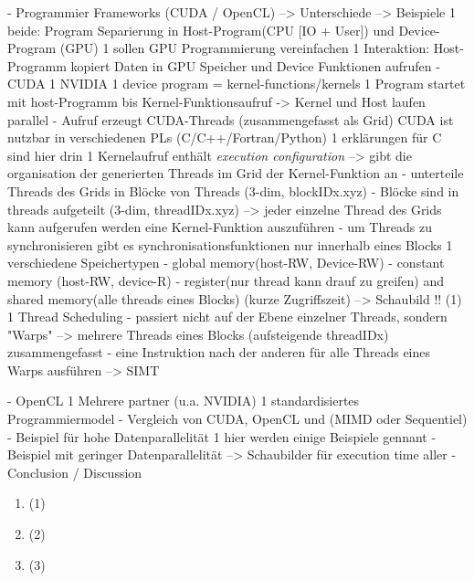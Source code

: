 \documentclass[a4paper,12pt]{llncs}
\numberwithin{equation}{section}
\begin{document}
    
    
  - Programmier Frameworks (CUDA / OpenCL)	
    --> Unterschiede
    --> Beispiele
    1 beide: Program Separierung in Host-Program(CPU [IO + User]) und Device-Program (GPU)
    1 sollen GPU Programmierung vereinfachen
    1 Interaktion: Host-Programm kopiert Daten in GPU Speicher und Device Funktionen aufrufen
    - CUDA
      1 NVIDIA
      1 device program = kernel-functions/kernels
      1 Program startet mit host-Programm bis Kernel-Funktionsaufruf -> Kernel und Host laufen parallel
      	- Aufruf erzeugt CUDA-Threads (zusammengefasst als Grid)
      CUDA ist nutzbar in verschiedenen PLs (C/C++/Fortran/Python)
      1 erklärungen für C sind hier drin
	  1 Kernelaufruf enthält \textit{execution configuration}
	  	--> gibt die organisation der generierten Threads im Grid der Kernel-Funktion an
	  	  - unterteile Threads des Grids in Blöcke von Threads (3-dim, blockIDx.xyz)
	  	  - Blöcke sind in threads aufgeteilt (3-dim, threadIDx.xyz)
	   --> jeder einzelne Thread des Grids kann aufgerufen werden eine Kernel-Funktion auszuführen      
          - um Threads zu synchronisieren gibt es synchronisationsfunktionen nur innerhalb eines Blocks
      1 verschiedene Speichertypen
        - global memory(host-RW, Device-RW)
        - constant memory (host-RW, device-R)
        - register(nur thread kann drauf zu greifen) and shared memory(alle threads eines Blocks) (kurze Zugriffszeit)
        --> Schaubild !! (1)
      1 Thread Scheduling
        - passiert nicht auf der Ebene einzelner Threads, sondern "Warps" --> mehrere Threads eines Blocks (aufsteigende threadIDx) zusammengefasst
        - eine Instruktion nach der anderen für alle Threads eines Warps ausführen --> SIMT
      
    - OpenCL
      1 Mehrere partner (u.a. NVIDIA) 
      1 standardisiertes Programmiermodel
- Vergleich von CUDA, OpenCL und (MIMD oder Sequentiel)
  - Beispiel für hohe Datenparallelität
  	1 hier werden einige Beispiele gennant
  - Beispiel mit geringer Datenparallelität
  --> Schaubilder für execution time aller 
- Conclusion / Discussion

\begin{enumerate}
\item \cite{Rauber.2012} (1)
\item \cite{Lindholm.2008} (2)
\item \cite{Burgess.2020} (3)
\end{enumerate}
\end{document}
